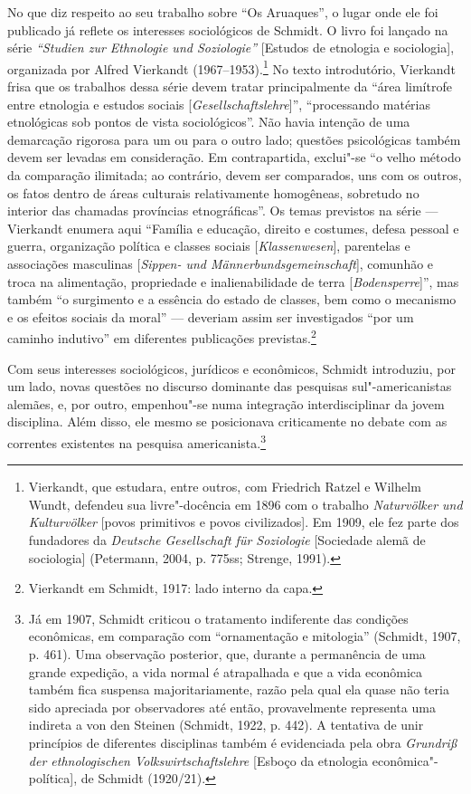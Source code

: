 No que diz respeito ao seu trabalho sobre ``Os Aruaques'', o lugar onde
ele foi publicado já reflete os interesses sociológicos de Schmidt. O
livro foi lançado na série \emph{``Studien zur Ethnologie und
Soziologie''} {[}Estudos de etnologia e sociologia{]}, organizada por
Alfred Vierkandt (1967--1953).\footnote{Vierkandt, que estudara, entre
  outros, com Friedrich Ratzel e Wilhelm Wundt, defendeu sua
  livre"-docência em 1896 com o trabalho \emph{Naturvölker und
  Kulturvölker} {[}povos primitivos e povos civilizados{]}. Em 1909, ele
  fez parte dos fundadores da \emph{Deutsche Gesellschaft für
  Soziologie} {[}Sociedade alemã de sociologia{]} (Petermann, 2004, p.
  775ss; Strenge, 1991).} No texto introdutório, Vierkandt frisa que os
trabalhos dessa série devem tratar principalmente da ``área limítrofe
entre etnologia e estudos sociais {[}\emph{Gesellschaftslehre}{]}'',
``processando matérias etnológicas sob pontos de vista sociológicos''.
Não havia intenção de uma demarcação rigorosa para um ou para o outro
lado; questões psicológicas também devem ser levadas em consideração. Em
contrapartida, exclui"-se ``o velho método da comparação ilimitada; ao
contrário, devem ser comparados, uns com os outros, os fatos dentro de
áreas culturais relativamente homogêneas, sobretudo no interior das
chamadas províncias etnográficas''. Os temas previstos na série ---
Vierkandt enumera aqui ``Família e educação, direito e costumes, defesa
pessoal e guerra, organização política e classes sociais
{[}\emph{Klassenwesen}{]}, parentelas e associações masculinas
{[}\emph{Sippen- und Männerbundsgemeinschaft}{]}, comunhão e troca na
alimentação, propriedade e inalienabilidade de terra
{[}\emph{Bodensperre}{]}'', mas também ``o surgimento e a essência do
estado de classes, bem como o mecanismo e os efeitos sociais da moral''
--- deveriam assim ser investigados ``por um caminho indutivo'' em
diferentes publicações previstas.\footnote{Vierkandt em Schmidt, 1917:
  lado interno da capa.}

Com seus interesses sociológicos, jurídicos e econômicos, Schmidt
introduziu, por um lado, novas questões no discurso dominante das
pesquisas sul"-americanistas alemães, e, por outro, empenhou"-se numa
integração interdisciplinar da jovem disciplina. Além disso, ele mesmo
se posicionava criticamente no debate com as correntes existentes na
pesquisa americanista.\footnote{Já em 1907, Schmidt criticou o
  tratamento indiferente das condições econômicas, em comparação com
  ``ornamentação e mitologia'' (Schmidt, 1907, p. 461). Uma observação
  posterior, que, durante a permanência de uma grande expedição, a vida
  normal é atrapalhada e que a vida econômica também fica suspensa
  majoritariamente, razão pela qual ela quase não teria sido apreciada
  por observadores até então, provavelmente representa uma indireta a
  von den Steinen (Schmidt, 1922, p. 442). A tentativa de unir
  princípios de diferentes disciplinas também é evidenciada pela obra
  \emph{Grundriß der ethnologischen Volkswirtschaftslehre} {[}Esboço da
  etnologia econômica"-política{]}, de Schmidt (1920/21).}

